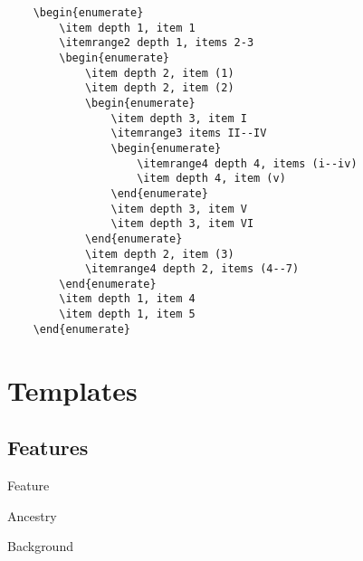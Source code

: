 \documentclass[itdr]{subfiles}
\begin{document}
\vfill

\begin{lstlisting}
	\begin{enumerate}
		\item depth 1, item 1
		\itemrange2 depth 1, items 2-3
		\begin{enumerate}
			\item depth 2, item (1)
			\item depth 2, item (2)
			\begin{enumerate}
				\item depth 3, item I
				\itemrange3 items II--IV
				\begin{enumerate}
					\itemrange4 depth 4, items (i--iv)
					\item depth 4, item (v)
				\end{enumerate}
				\item depth 3, item V
				\item depth 3, item VI
			\end{enumerate}
			\item depth 2, item (3)
			\itemrange4 depth 2, items (4--7)
		\end{enumerate}
		\item depth 1, item 4
		\item depth 1, item 5
	\end{enumerate}
\end{lstlisting}

\cleartoleftpage

\section{Templates}

\subsection{Features}

\noindent{} Feature

\noindent{} Ancestry

\noindent{} Background

\noindent{} 

\vspace{-0.7\baselineskip}
\end{document}
